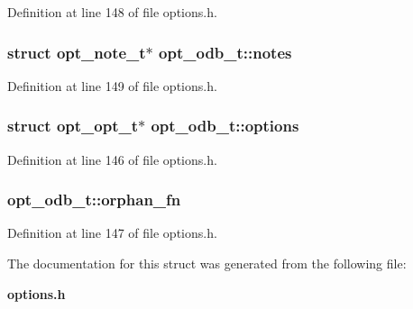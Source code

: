 Definition at line 148 of file options.h.
\subsubsection[{notes}]{\setlength{\rightskip}{0pt plus 5cm}struct {\bf opt\_\-note\_\-t}$\ast$ {\bf opt\_\-odb\_\-t::notes}\hspace{0.3cm}{\tt  [read]}}\label{structopt__odb__t_2b04bbf9daee5af8e6fa3c4c9c6374e5}




Definition at line 149 of file options.h.
\subsubsection[{options}]{\setlength{\rightskip}{0pt plus 5cm}struct {\bf opt\_\-opt\_\-t}$\ast$ {\bf opt\_\-odb\_\-t::options}\hspace{0.3cm}{\tt  [read]}}\label{structopt__odb__t_521f0ce60ba6ee26f7f7b36543c04311}




Definition at line 146 of file options.h.
\subsubsection[{orphan\_\-fn}]{ {\bf opt\_\-odb\_\-t::orphan\_\-fn}}\label{structopt__odb__t_98c02671dffe17aa45f362fc1b56a393}




Definition at line 147 of file options.h.

The documentation for this struct was generated from the following file:\begin{CompactItemize}
\item 
{\bf options.h}\end{CompactItemize}
